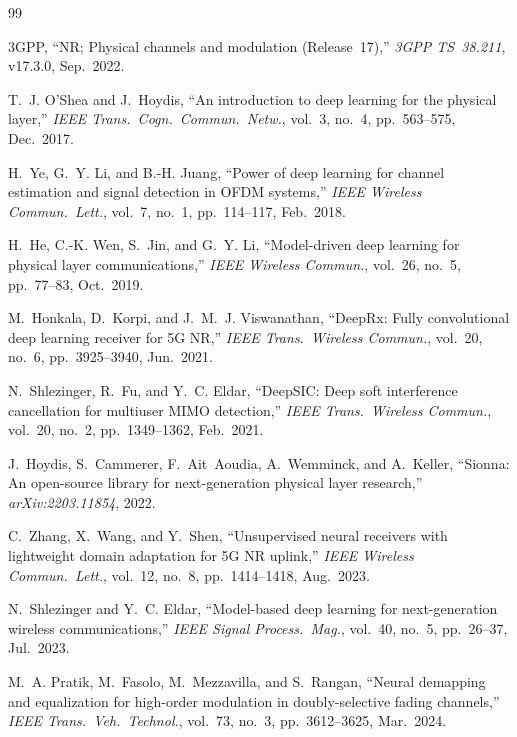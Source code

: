 \documentclass{ieeeaccess}
\begin{document}
\newpage
\begin{thebibliography}{99}

3GPP, ``NR; Physical channels and modulation (Release~17),''
\emph{3GPP TS~38.211}, v17.3.0, Sep.~2022.

T.~J. O'Shea and J.~Hoydis, ``An introduction to deep learning for the physical layer,''
\emph{IEEE Trans.\ Cogn.\ Commun.\ Netw.}, vol.~3, no.~4, pp.~563--575, Dec.~2017.

H.~Ye, G.~Y. Li, and B.-H. Juang, ``Power of deep learning for channel estimation and signal
detection in OFDM systems,'' \emph{IEEE Wireless Commun.\ Lett.}, vol.~7, no.~1,
pp.~114--117, Feb.~2018.

H.~He, C.-K. Wen, S.~Jin, and G.~Y. Li, ``Model-driven deep learning for physical layer
communications,'' \emph{IEEE Wireless Commun.}, vol.~26, no.~5, pp.~77--83, Oct.~2019.

M.~Honkala, D.~Korpi, and J.~M.~J. Viswanathan, ``DeepRx: Fully convolutional deep
learning receiver for 5G NR,'' \emph{IEEE Trans.\ Wireless Commun.}, vol.~20, no.~6,
pp.~3925--3940, Jun.~2021.

N.~Shlezinger, R.~Fu, and Y.~C. Eldar, ``DeepSIC: Deep soft interference cancellation
for multiuser MIMO detection,'' \emph{IEEE Trans.\ Wireless Commun.}, vol.~20, no.~2,
pp.~1349--1362, Feb.~2021.

J.~Hoydis, S.~Cammerer, F.~Ait~Aoudia, A.~Wemminck, and A.~Keller,
``Sionna: An open-source library for next-generation physical layer research,''
\emph{arXiv:2203.11854}, 2022.

C.~Zhang, X.~Wang, and Y.~Shen, ``Unsupervised neural receivers with lightweight domain
adaptation for 5G NR uplink,'' \emph{IEEE Wireless Commun.\ Lett.}, vol.~12, no.~8,
pp.~1414--1418, Aug.~2023.

N.~Shlezinger and Y.~C. Eldar, ``Model-based deep learning for next-generation wireless
communications,'' \emph{IEEE Signal Process.\ Mag.}, vol.~40, no.~5, pp.~26--37, Jul.~2023.

M.~A. Pratik, M.~Fasolo, M.~Mezzavilla, and S.~Rangan,
``Neural demapping and equalization for high-order modulation in doubly-selective fading
channels,'' \emph{IEEE Trans.\ Veh.\ Technol.}, vol.~73, no.~3, pp.~3612--3625, Mar.~2024.


\end{thebibliography}
\end{document}
